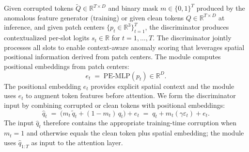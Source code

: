Given corrupted tokens \(\tilde{Q}\in\mathbb{R}^{T\times D}\) and binary mask \(m\in\{0,1\}^T\) produced by the anomalous feature generator (training) or given clean tokens \(Q\in\mathbb{R}^{T\times D}\) at inference, and given patch centers \(\{p_t\in\mathbb{R}^3\}_{t=1}^T\), the discriminator produces contextualized per-slot logits \(s_t\in\mathbb{R}\) for \(t=1,\dots,T\). The discriminator jointly processes all slots to enable context-aware anomaly scoring that leverages spatial positional information derived from patch centers. The module computes positional embeddings from patch centers:
\begin{equation}
e_t \;=\; \mathrm{PE\text{-}MLP}(p_t) \in\mathbb{R}^D.
\end{equation}
The positional embedding \(e_t\) provides explicit spatial context and the module uses \(e_t\) to augment token features before attention. We form the discriminator input by combining corrupted or clean tokens with positional embeddings:
\begin{equation}
\hat{q}_t \;=\; \big(m_t\,\tilde{q}_t + (1-m_t)\,q_t\big) + e_t \;=\; q_t + m_t(\gamma\varepsilon_t) + e_t.
\end{equation}
The input \(\hat{q}_t\) therefore contains the appropriate training-time corruption when \(m_t=1\) and otherwise equals the clean token plus spatial embedding; the module uses \(\hat{q}_{1:T}\) as input to the attention layer.

